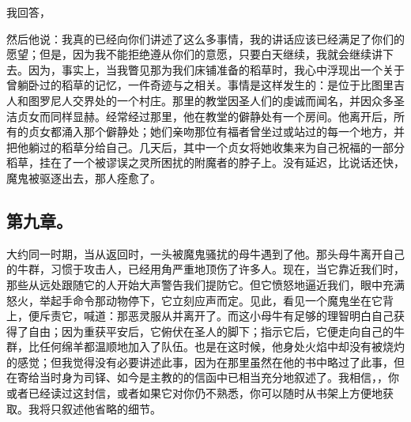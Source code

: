 我回答，\par

然后他说：我真的已经向你们讲述了这么多事情，我的讲话应该已经满足了你们的愿望；但是，因为我不能拒绝遵从你们的意愿，只要白天继续，我就会继续讲下去。因为，事实上，当我瞥见那为我们床铺准备的稻草时，我心中浮现出一个关于曾躺卧过的稻草的记忆，一件奇迹与之相关。事情是这样发生的：是位于比图里吉人和图罗尼人交界处的一个村庄。那里的教堂因圣人们的虔诚而闻名，并因众多圣洁贞女而同样显赫。经常经过那里，他在教堂的僻静处有一个房间。他离开后，所有的贞女都涌入那个僻静处；她们亲吻那位有福者曾坐过或站过的每一个地方，并把他躺过的稻草分给自己。几天后，其中一个贞女将她收集来为自己祝福的一部分稻草，挂在了一个被谬误之灵所困扰的附魔者的脖子上。没有延迟，比说话还快，魔鬼被驱逐出去，那人痊愈了。\par


\subsection{第九章。}

大约同一时期，当从返回时，一头被魔鬼骚扰的母牛遇到了他。那头母牛离开自己的牛群，习惯于攻击人，已经用角严重地顶伤了许多人。现在，当它靠近我们时，那些从远处跟随它的人开始大声警告我们提防它。但它愤怒地逼近我们，眼中充满怒火，举起手命令那动物停下，它立刻应声而定。见此，看见一个魔鬼坐在它背上，便斥责它，喊道：那恶灵服从并离开了。而这小母牛有足够的理智明白自己获得了自由；因为重获平安后，它俯伏在圣人的脚下；指示它后，它便走向自己的牛群，比任何绵羊都温顺地加入了队伍。也是在这时候，他身处火焰中却没有被烧灼的感觉；但我觉得没有必要讲述此事，因为在那里虽然在他的书中略过了此事，但在寄给当时身为司铎、如今是主教的的信函中已相当充分地叙述了。我相信，，你或者已经读过这封信，或者如果它对你仍不熟悉，你可以随时从书架上方便地获取。我将只叙述他省略的细节。\newline{}\par

